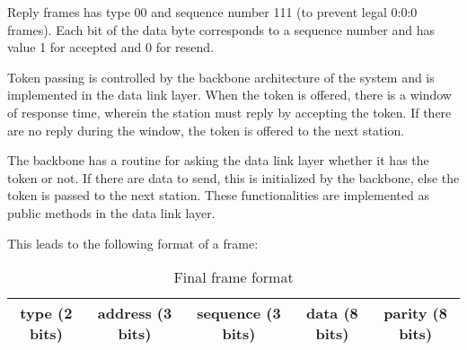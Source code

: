 Reply frames has type 00 and sequence number 111 (to prevent legal 0:0:0
frames). Each bit of the data byte corresponds to a sequence number and has
value 1 for accepted and 0 for resend.

Token passing is controlled by the backbone architecture of the system and is
implemented in the data link layer. When the token is offered,
there is a window of response time, wherein the station must reply by accepting
the token. If there are no reply during the window, the token is offered to the
next station. 

The backbone has a routine for asking the data link layer whether
it has the token or not. If there are data to send, this is initialized by the
backbone, else the token is passed to the next station. These functionalities
are implemented as public methods in the data link layer.

This leads to the following format of a frame: 

\begin{table}[htb]
	\begin{center}
	\begin{tabular}{|ccc|c|c|}
		\hline
		type (2 bits) & address (3 bits) & sequence (3 bits) & data (8 bits) & parity
		(8 bits)  \\
		\hline
	\end{tabular}
	\end{center}
	\caption{Final frame format}
	\label{tab:final_frame_format}
\end{table}